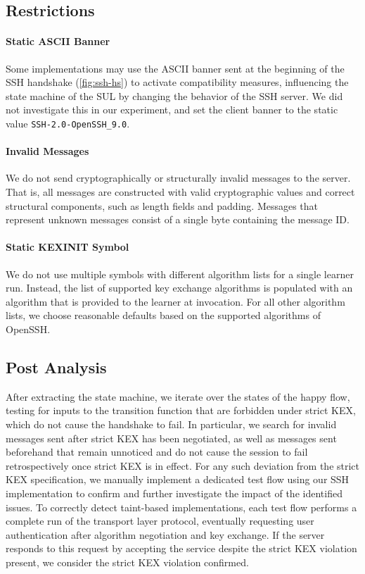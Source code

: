 \subsection{Restrictions}

\paragraph{Static ASCII Banner}

Some implementations may use the ASCII banner sent at the beginning of the SSH handshake (\autoref{fig:ssh-hs}) to activate compatibility measures, influencing the state machine of the SUL by changing the behavior of the SSH server. We did not investigate this in our experiment, and set the client banner to the static value \texttt{SSH-2.0-OpenSSH\_9.0}.

\paragraph{Invalid Messages}

We do not send cryptographically or structurally invalid messages to the server. That is, all messages are constructed with valid cryptographic values and correct structural components, such as length fields and padding. Messages that represent unknown messages consist of a single byte containing the message ID.

\paragraph{Static KEXINIT Symbol}

We do not use multiple \msgkexinit symbols with different algorithm lists for a single learner run. Instead, the list of supported key exchange algorithms is populated with an algorithm that is provided to the learner at invocation. For all other algorithm lists, we choose reasonable defaults based on the supported algorithms of OpenSSH.

\subsection{Post Analysis}
\label{sub:postAnalysis}

After extracting the state machine, we iterate over the states of the happy flow, testing for inputs to the transition function that are forbidden under strict KEX, which do not cause the handshake to fail. In particular, we search for invalid messages sent after strict KEX has been negotiated, as well as messages sent beforehand that remain unnoticed and do not cause the session to fail retrospectively once strict KEX is in effect. For any such deviation from the strict KEX specification, we manually implement a dedicated test flow using our SSH implementation to confirm and further investigate the impact of the identified issues. To correctly detect taint-based implementations, each test flow performs a complete run of the transport layer protocol, eventually requesting user authentication after algorithm negotiation and key exchange. If the server responds to this request by accepting the service despite the strict KEX violation present, we consider the strict KEX violation confirmed.
